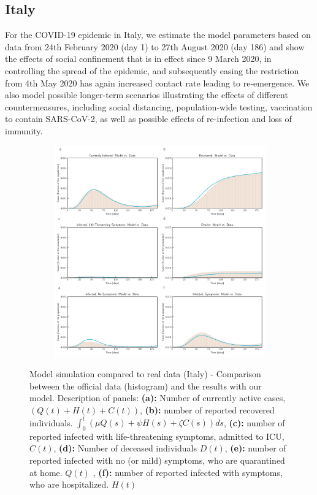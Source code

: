 \documentclass[fleqn,10pt]{wlscirep}
\begin{document}
\subsection*{Italy}
For the COVID-19 epidemic in Italy, we estimate the model parameters based on data from 24th February 2020 (day 1) to 27th August 2020 (day 186) and show the effects of social confinement that is in effect since 9 March 2020, in controlling the spread of the epidemic, and subsequently easing the restriction from 4th May 2020 has again increased contact rate leading to re-emergence. We also model possible longer-term scenarios illustrating the effects of different countermeasures, including social distancing, population-wide testing, vaccination to contain SARS-CoV-2, as well as possible effects of re-infection and loss of immunity.
%
%
\begin{figure}[t!]
	\centering
	\begin{subfigure}[b]{\textwidth}
		\centering
		\includegraphics[width=\linewidth]{Italy_plot_model_data.pdf}
	\end{subfigure}
	\caption{Model simulation compared to real data (Italy) - Comparison between the official data (histogram) and the results with our model. Description of panels: \textbf{(a):} Number of currently active cases, $\left( Q(t) + H(t) + C(t)\right)$, \textbf{(b):} number of reported recovered individuals. $\int_{0}^{t}{\left( \mu Q(s) + \psi H(s) + \zeta  C(s) \right) ds}$, \textbf{(c):} number of reported infected with life-threatening symptoms, admitted to ICU, $C(t)$, \textbf{(d):} Number of deceased individuals $D(t)$, \textbf{(e):} number of reported infected with no (or mild) symptoms, who are quarantined at home. $Q(t)$ , \textbf{(f):} number of reported infected with symptoms, who are hospitalized. $H(t)$}
	\label{fig2A} 
\end{figure}
%
\end{document}
